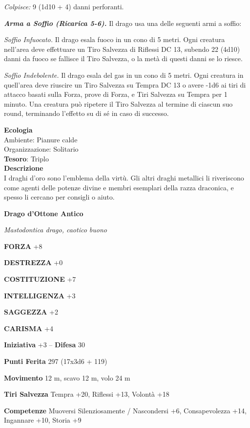 \begin{multicols}{2}
	\textit{Colpisce:} 9 (1d10 + 4) danni perforanti.

	\textit{\textbf{Arma a Soffio (Ricarica 5-6).}} Il drago usa una delle seguenti armi a soffio:

	\textit{Soffio Infuocato.} Il drago esala fuoco in un cono di 5 metri. Ogni creatura nell'area deve effettuare un Tiro Salvezza di Riflessi DC 13, subendo 22 (4d10) danni da fuoco se fallisce il Tiro Salvezza, o la metà di questi danni se lo riesce.

	\textit{Soffio Indebolente.} Il drago esala del gas in un cono di 5 metri. Ogni creatura in quell'area deve riuscire un Tiro Salvezza su Tempra DC 13 o avere -1d6 ai tiri di attacco basati sulla Forza, prove di Forza, e Tiri Salvezza su Tempra per 1 minuto. Una creatura può ripetere il Tiro Salvezza al termine di ciascun suo round, terminando l'effetto su di sé in caso di successo.

	\textbf{Ecologia}\\
	Ambiente: Pianure calde\\
	Organizzazione: Solitario\\
	\textbf{Tesoro}: Triplo\\
	\textbf{Descrizione}\\
	I draghi d'oro sono l'emblema della virtù. Gli altri draghi metallici li riveriscono come agenti delle potenze divine e membri esemplari della razza draconica, e spesso li cercano per consigli o aiuto.

	\medskip{}\textbf{Drago d'Ottone Antico}

	\textit{Mastodontica drago, caotico buono}

	\textbf{FORZA} +8

	\textbf{DESTREZZA} +0

	\textbf{COSTITUZIONE} +7

	\textbf{INTELLIGENZA} +3

	\textbf{SAGGEZZA} +2

	\textbf{CARISMA} +4

	\textbf{Iniziativa} +3 -- \textbf{Difesa} 30

	\textbf{Punti Ferita} 297 (17x3d6 + 119)

	\textbf{Movimento} 12 m, scavo 12 m, volo 24 m

	\textbf{Tiri Salvezza} Tempra +20, Riflessi +13, Volontà +18

	\textbf{Competenze} Muoversi Silenziosamente / Nascondersi +6, Consapevolezza +14, Ingannare +10, Storia +9


\end{multicols}
